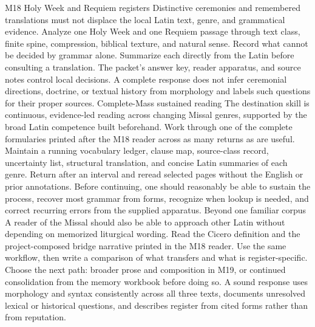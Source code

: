 \begin{courseunit}{M18}
\SubmoduleExtension
  {Holy Week and Requiem registers}
  {Distinctive ceremonies and remembered translations must not displace the
  local Latin text, genre, and grammatical evidence.}
  {Analyze one Holy Week and one Requiem passage through text class, finite
  spine, compression, biblical texture, and natural sense.  Record what cannot
  be decided by grammar alone.}
  {Summarize each directly from the Latin before consulting a translation.}
  {The packet's answer key, reader apparatus, and source notes control local
  decisions.  A complete response does not infer ceremonial directions,
  doctrine, or textual history from morphology and labels such questions for
  their proper sources.}
\SubmoduleExtension
  {Complete-Mass sustained reading}
  {The destination skill is continuous, evidence-led reading across changing
  Missal genres, supported by the broad Latin competence built beforehand.}
  {Work through one of the complete formularies printed after the M18 reader
  across as many returns as are useful. Maintain
  a running vocabulary ledger, clause map, source-class record, uncertainty
  list, structural translation, and concise Latin summaries of each genre.}
  {Return after an interval and reread selected pages without the English or
  prior annotations.}
  {Before continuing, one should reasonably be able to sustain the process,
  recover most grammar
  from forms, recognize when lookup is needed, and correct recurring errors
  from the supplied apparatus.}
\SubmoduleExtension
  {Beyond one familiar corpus}
  {A reader of the Missal should also be able to approach other Latin without
  depending on memorized liturgical wording.}
  {Read the Cicero definition and the project-composed bridge narrative printed
  in the M18 reader.  Use the same workflow, then write a comparison of what
  transfers and what is register-specific.}
  {Choose the next path: broader prose and composition in M19, or continued
  consolidation from the memory workbook before doing so.}
  {A sound response uses morphology and syntax consistently across all three
  texts, documents unresolved lexical or historical questions, and describes
  register from cited forms rather than from reputation.}
\end{courseunit}

